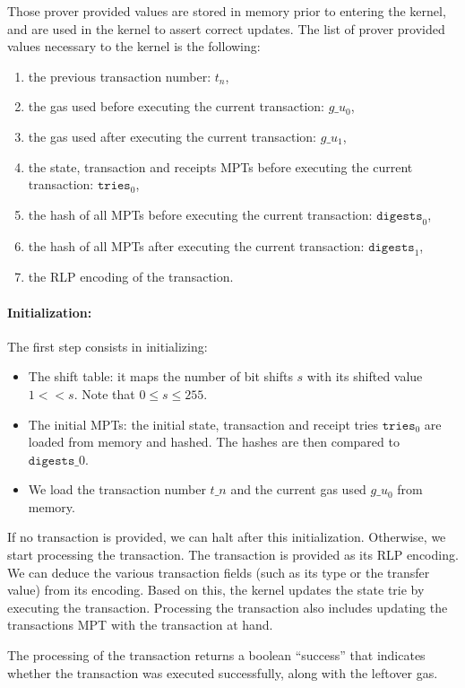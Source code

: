 Those prover provided values are stored in memory prior to entering the kernel, and are used in the kernel to assert correct updates. The list of prover provided values necessary to the kernel is the following:
\begin{enumerate}
    \item the previous transaction number: $t_n$,
    \item the gas used before executing the current transaction: $g\_u_0$,
    \item the gas used after executing the current transaction: $g\_u_1$,
    \item the state, transaction and receipts MPTs before executing the current transaction: $\texttt{tries}_0$,
    \item the hash of all MPTs before executing the current transaction: $\texttt{digests}_0$,
    \item the hash of all MPTs after executing the current transaction: $\texttt{digests}_1$,
    \item the RLP encoding of the transaction.
\end{enumerate}

\paragraph*{Initialization:} The first step consists in initializing:
\begin{itemize}
    \item The shift table: it maps the number of bit shifts $s$ with its shifted value $1 << s$. Note that $0 \leq s \leq 255$.
    \item The initial MPTs: the initial state, transaction and receipt tries $\texttt{tries}_0$ are loaded from memory and hashed. The hashes are then compared to $\texttt{digests}\_0$.
    \item We load the transaction number $t\_n$ and the current gas used $g\_u_0$ from memory.
\end{itemize}

If no transaction is provided, we can halt after this initialization. Otherwise, we start processing the transaction. The transaction is provided as its RLP encoding. We can deduce the various transaction fields (such as its type or the transfer value) from its encoding. Based on this, the kernel updates the state trie by executing the transaction. Processing the transaction also includes updating the transactions MPT with the transaction at hand.

The processing of the transaction returns a boolean ``success'' that indicates whether the transaction was executed successfully, along with the leftover gas. 


